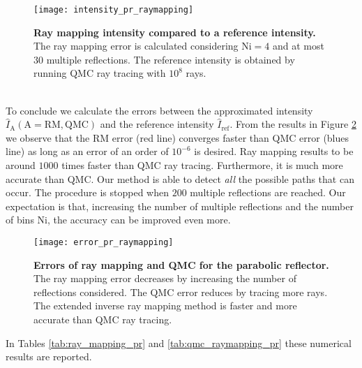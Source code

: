\begin{figure}[t]
  \begin{center}
  \texttt{[image: intensity\_pr\_raymapping]}
  \end{center}
  \caption{\textbf{Ray mapping intensity compared to a reference intensity.}
The ray mapping error is calculated considering $\textrm{Ni}=4$ and at most $30$ multiple reflections. The reference intensity is obtained by running QMC ray tracing with $10^8$ rays.}
\label{fig:intensity_pr_raymapping}
 \end{figure}
\\ \indent
To conclude we calculate the errors between the approximated intensity $\hat{I}_{\textrm{A}} (\textrm{A}=\textrm{RM}, \textrm{QMC})$ and the reference intensity $\hat{I}_{\textrm{ref}}$. From the results in Figure \ref{fig:error_raymapping_pr} we observe that the RM error (red line) converges faster than QMC error (blues line) as long as an error of an order of $10^{-6}$ is desired. Ray mapping results to be around $1000$ times faster than QMC ray tracing. Furthermore, it is much more accurate than QMC. Our method is able to detect \textit{all} the possible paths that can occur. The procedure is stopped when $200$ multiple reflections are reached. Our expectation is that, increasing the number of multiple reflections and the number of bins $\textrm{Ni}$, the accuracy can be improved even more.
\begin{figure}[h]
  \begin{center}
  \texttt{[image: error\_pr\_raymapping]}
  \end{center}
  \caption{\textbf{Errors of ray mapping and QMC for the parabolic reflector.}
The ray mapping error decreases by increasing the number of reflections considered.
The QMC error reduces by tracing more rays.
 The extended inverse ray mapping method is faster and more accurate than QMC ray tracing.}
\label{fig:error_raymapping_pr}
 \end{figure}
In Tables \ref{tab:ray_mapping_pr} and \ref{tab:qmc_raymapping_pr} these numerical results are reported.
